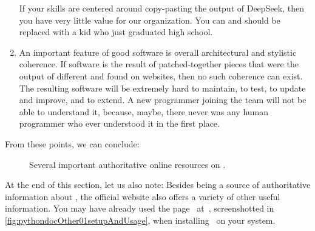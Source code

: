 \begin{noglslink}
\begin{enumerate}
If your skills are centered around copy-pasting the output of DeepSeek, then you have very little value for our organization. %
You can and should be replaced with a kid who just graduated high school.%
%
\item An important feature of good software is overall architectural and stylistic coherence. %
If software is the result of patched-together pieces that were the output of different  and found on websites, then no such coherence can exist. %
The resulting software will be extremely hard to maintain, to test, to update and improve, and to extend. %
A new programmer joining the team will not be able to understand it, because, maybe, there never was any human programmer who ever understood it in the first place.%
%
\end{enumerate}%
%
From these points, we can conclude:%
%
%
%
%
\begin{figure}%
\centering%
%
%
%
\floatSep%
%
%
%
\floatRowSep%
%
%
%
\floatSep%
%
%
%
\caption{Several important authoritative online resources on \python.}%
\label{fig:pythondoc:D}%
\end{figure}%
%
At the end of this section, let us also note:
Besides being a source of authoritative information about \python, the official website  also offers a variety of other useful information.
You may have already used the  page~\cite{PSF:P3D:PSAU} at~, screenshotted in \cref{fig:pythondocOther01setupAndUsage}, when installing \python\ on your system.


\end{noglslink}
